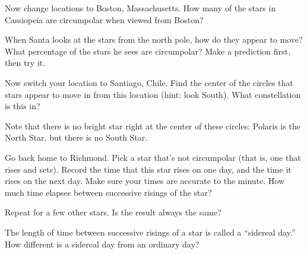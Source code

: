 Now change locations to Boston, Massachusetts.  How many of the stars
in Cassiopeia are circumpolar when viewed from Boston?

\vskip 1in

When Santa looks at the stars from the north pole, how do they
appear to move?  What percentage of the stars he sees are circumpolar?
Make a prediction first, then try it.

\vskip 1in

Now switch your location to Santiago, Chile.  Find the center of the
circles that stars appear to move in from this location (hint: look South).
What constellation is this in?

\vskip 1in

Note that there is no bright star right at the center of these circles:
Polaris is the North Star, but there is no South Star.

Go back home to Richmond.
Pick a star that's not circumpolar (that is, one that rises and sets).
Record the time that this star rises on one day, and the time it
rises on the next day.  Make sure your times are accurate to the minute.
How much time elapses between successive risings of the star?

\vskip 1in

Repeat for a few other stars.  Is the result always the same?

\vskip 1in


The length of time between successive risings of a star is called a
``sidereal day.''  How different is a sidereal day from  an ordinary
day?

